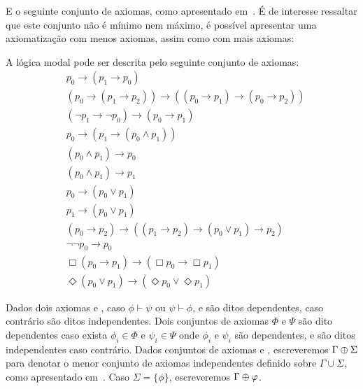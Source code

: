        E o seguinte conjunto de axiomas, como apresentado em~. É de interesse ressaltar que este conjunto não é mínimo nem máximo,
        é possível apresentar uma axiomatização com menos axiomas, assim como com mais axiomas:

        \begin{definicao}
            \label{def:AxiomaisModais}
            A lógica modal pode ser descrita pelo seguinte conjunto \LAMBDAlm de axiomas:
            \begingroup
            \allowdisplaybreaks
            \begin{align*}
                &p_0 \to (p_1 \to p_0) \tag{Ax1} \\
                &(p_0 \to (p_1 \to p_2)) \to ((p_0 \to p_1) \to (p_0 \to p_2)) \tag{Ax2} \\
                &(\neg p_1 \to \neg p_0) \to (p_0 \to p_1) \tag{Ax3} \\
                &p_0 \to (p_1 \to (p_0 \land p_1)) \tag{Ax4} \\
                &(p_0 \land p_1) \to p_0 \tag{Ax5} \\
                &(p_0 \land p_1) \to p_1 \tag{Ax6} \\
                &p_0 \to (p_0 \lor p_1) \tag{Ax7} \\
                &p_1 \to (p_0 \lor p_1) \tag{Ax8} \\
                &(p_0 \to p_2) \to ((p_1 \to p_2) \to (p_0 \lor p_1) \to p_2) \tag{Ax9} \\
                &\neg \neg p_0 \to p_0 \tag{Ax10} \\
                &\Box (p_0 \to p_1) \to (\Box p_0 \to \Box p_1) \tag{K} \label{Ax:K} \\
                &\Diamond (p_0 \lor p_1) \to (\Diamond p_0 \lor \Diamond p_1) \tag*{(Possibilidade) \ \qed} \label{Ax:Poss}
            \end{align*}
            \endgroup
        \end{definicao}
        Dados dois axiomas \PHI e \PSI, caso \(\phi \vdash \psi\) ou \(\psi \vdash \phi\), \PHI e \PSI são ditos dependentes, caso contrário são ditos independentes.
        Dois conjuntos de axiomas \(\Phi\) e \(\Psi\) são dito dependentes caso exista \(\phi_i \in \Phi\) e \(\psi_i \in \Psi\) onde \(\phi_i\) e \(\psi_i\) são dependentes,
        e são ditos independentes caso contrário. Dados conjuntos de axiomas \GAMMA e \SIGMA, escreveremos \(\Gamma \mathbin{\oplus} \Sigma\) para denotar o menor
        conjunto de axiomas independentes definido sobre \(\Gamma \cup \Sigma\), como apresentado em~. Caso \(\Sigma = \{\phi\}\), escreveremos \(\Gamma \mathbin{\oplus} \varphi\).

